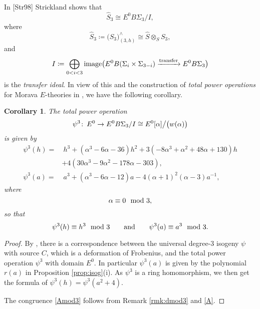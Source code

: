 \documentclass{gtpart}
\newtheorem{cor}[thm]{Corollary}
\theoremstyle{definition}
\theoremstyle{remark}
\def\co{\colon\thinspace}
\newcommand{\HS}{\widehat{S}}
\newcommand{\md}{~~{\rm mod}~}
\newcommand{\ad}{{\rm and}}
\newcommand{\A}{\alpha}
\newcommand{\p}{\psi^3}
\newcommand{\isog}[1]{Proposition \ref{prop:isog}\thinspace (#1)}
\begin{document}
In [Str98] Strickland shows that 
\[
 \HS_3 \cong E^0 B\Sigma_3 / I, 
\]
where 
\[
 \HS_3 \coloneqq \big( S_3 \big)_{(3,h)}^\wedge \cong \HS \otimes_S S_3, 
\]
and
\begin{equation}
\label{transfer}
 I \coloneqq \bigoplus_{0<i<3} {\rm image} \big( E^0 B(\Sigma_i \times \Sigma_{3-i}) \xrightarrow{\rm transfer} E^0 B\Sigma_3 \big) 
\end{equation}
is the {\em transfer ideal}.  
In view of this and the construction of {\em total power operations} for Morava $E$-theories in \cite[3.23]{cong}, we have the following corollary.  
\begin{cor}
\label{cor:psi3}
 The total power operation 
 \[
  \p \co E^0 \to E^0 B\Sigma_3 / I \cong E^0 [\A] \big/ \big( w(\A) \big) 
 \]
 is given by 
 \begin{equation*}
 \begin{split}
  \p(h) = & ~ h^3 + (\A^3 - 6 \A - 36) h^2 + 3 (-8 \A^3 + \A^2 + 48 \A + 130) h \\
          & + 4 (30 \A^3 - 9 \A^2 - 178 \A - 303), \\
  \p(a) = & ~ a^3 + (\A^3 - 6 \A - 12) a - 4 (\A + 1)^2 (\A - 3) a^{-1}, 
 \end{split}
 \end{equation*}
 where 
 \begin{equation}
 \label{Amod3}
  \A \equiv 0 \md 3, 
 \end{equation}
 so that 
 \[
  \p(h) \equiv h^3 \md 3 \qquad \ad \qquad \p(a) \equiv a^3 \md 3.  
 \]
\end{cor}
\begin{proof}
 By \cite[Theorem B]{cong}, there is a correspondence between the universal degree-3 isogeny $\psi$ with source $C$, which is a deformation of Frobenius, 
 and the total power operation $\p$ with domain $E^0$.  In particular $\p(a)$ is given by the polynomial $r(a)$ in \isog{i}.  
 As $\p$ is a ring homomorphism, we then get the formula of $\p(h) = \p(a^2 + 4)$.  

 The congruence \eqref{Amod3} follows from Remark \ref{rmk:dmod3} and \eqref{A}.  
\end{proof}
\end{document}
